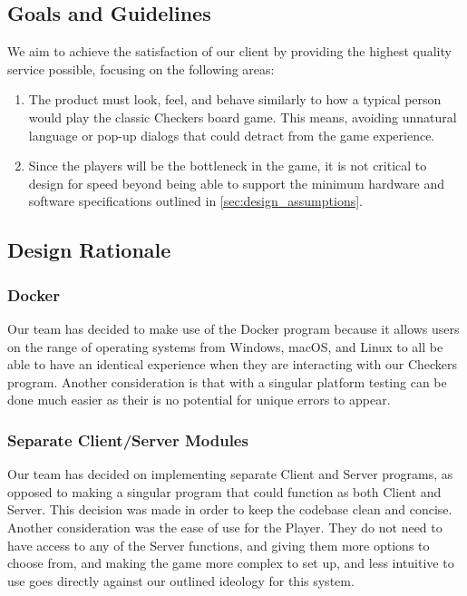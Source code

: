 \documentclass[letterpaper]{article}
\begin{document}
\subsection{Goals and Guidelines}
\label{sec:design_guidelines}

We aim to achieve the satisfaction of our client by providing
the highest quality service possible, focusing on the following
areas:

\begin{enumerate}
    \item The product must look, feel, and behave similarly to
          how a typical person would play the classic Checkers
          board game. This means, avoiding unnatural language or
          pop-up dialogs that could detract from the game
          experience.
    \item Since the players will be the bottleneck in the game,
          it is not critical to design for speed beyond being
          able to support the minimum hardware and software
          specifications outlined in
          \cref{sec:design_assumptions}.
\end{enumerate}

\subsection{Design Rationale}
\label{sec:design_rationale}

\subsubsection{Docker}
\label{sec:design_rationale_docker}

Our team has decided to make use of the Docker program because
it allows users on the range of operating systems from Windows,
macOS, and Linux to all be able to have an identical experience
when they are interacting with our Checkers program. Another
consideration is that with a singular platform testing can be
done much easier as their is no potential for unique errors to
appear.

\subsubsection{Separate Client/Server Modules}
\label{sec:design_rationale_client_server}

Our team has decided on implementing separate Client and Server
programs, as opposed to making a singular program that could
function as both Client and Server. This decision was made in
order to keep the codebase clean and concise. Another
consideration was the ease of use for the Player. They do not
need to have access to any of the Server functions, and giving
them more options to choose from, and making the game more
complex to set up, and less intuitive to use goes directly
against our outlined ideology for this system.
\end{document}
